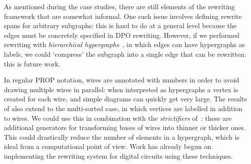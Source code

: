 As mentioned during the case studies, there are still elements of the rewriting
framework that are somewhat informal.
One such issue involves defining rewrite spans for arbitrary subgraphs: this is
hard to do at a general level because the edges must be concretely specified in
DPO rewriting.
However, if we performed rewriting with
\emph{hierarchical hypergraphs}~\cite{alvarez-picallo2021functorial}, in
which edges can have hypergraphs as labels, we could `compress' the subgraph
into a single edge that can be rewritten: this is future work.

In regular PROP notation, wires are annotated with numbers in order to avoid
drawing multiple wires in parallel: when interpreted as hypergraphs a vertex is
created for each wire, and simple diagrams can quickly get very large.
The results of \cite{bonchi2022stringa} also extend to the multi-sorted case, in
which vertices are labelled in addition to wires.
We could use this in combination with the \emph{strictifiers}
of~\cite{wilson2022string}: these are additional generators for transforming
buses of wires into thinner or thicker ones.
This could drastically reduce the number of elements in a hypergraph, which is
ideal from a computational point of view.
Work has already begun on implementing the rewriting system for digital circuits
using these techniques.